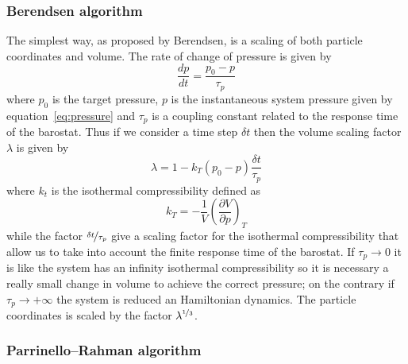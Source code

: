 \subsubsection{Berendsen algorithm}
The simplest way, as proposed by Berendsen, is a scaling of both particle coordinates and volume. The rate of change of pressure is given by
\begin{equation*}
	\frac{dp}{dt} = \frac{p_0 - p}{\tau_p}
\end{equation*}
where $p_0$ is the target pressure, $p$ is the instantaneous system pressure given by equation~\eqref{eq:pressure} and $\tau_p$ is a coupling constant related to the response time of the barostat. Thus if we consider a time step $\delta t$ then the volume scaling factor $\lambda$ is given by
\begin{equation*}
	\lambda = 1- k_T (p_0 - p) \frac{\delta t}{\tau_p}
\end{equation*}
where $k_t$ is the isothermal compressibility defined as
\begin{equation*}
	k_T = -\frac{1}{V}\left ( \frac{\partial V}{\partial p}\right )_{T}
\end{equation*}
while the factor $\nicefrac{\delta t}{\tau_p}$ give a scaling factor for the isothermal compressibility that allow us to take into account the finite response time of the barostat. If $\tau_p \rightarrow 0$ it is like the system has an infinity isothermal compressibility so it is necessary a really small change in volume to achieve the correct pressure; on the contrary if $\tau_p \rightarrow +\infty$ the system is reduced an Hamiltonian dynamics. The particle coordinates is scaled by the factor $\lambda^{\nicefrac{1}{3}}$. 

\subsubsection{Parrinello--Rahman algorithm}





